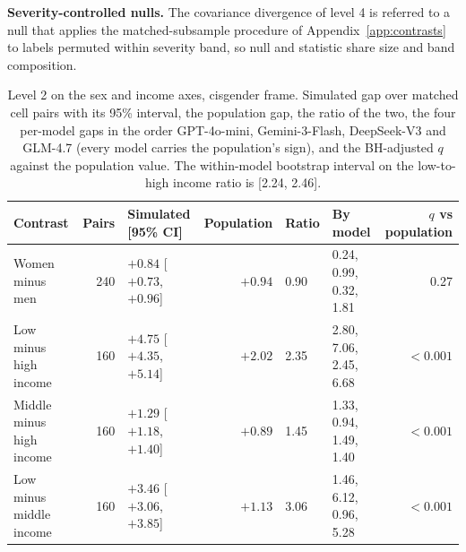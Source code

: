 \documentclass[wcp]{jmlr}
\begin{document}
\textbf{Severity-controlled nulls.} The covariance divergence of level 4 is referred to a null that applies the matched-subsample procedure of Appendix~\ref{app:contrasts} to labels permuted within severity band, so null and statistic share size and band composition.

\begin{table}[!htb]
\centering
\caption{Level 2 on the sex and income axes, cisgender frame. Simulated gap over matched cell pairs with its 95\% interval, the population gap, the ratio of the two, the four per-model gaps in the order GPT-4o-mini, Gemini-3-Flash, DeepSeek-V3 and GLM-4.7 (every model carries the population's sign), and the BH-adjusted $q$ against the population value. The within-model bootstrap interval on the low-to-high income ratio is [2.24, 2.46].}
\label{tab:level2ext}
\scriptsize
\setlength{\tabcolsep}{3pt}
\begin{tabular}{lrlrllr}
\toprule
Contrast & Pairs & Simulated [95\% CI] & Population & Ratio & By model & $q$ vs population \\
\midrule
Women minus men & 240 & $+0.84$ [$+0.73$, $+0.96$] & $+0.94$ & 0.90 & 0.24, 0.99, 0.32, 1.81 & 0.27 \\
Low minus high income & 160 & $+4.75$ [$+4.35$, $+5.14$] & $+2.02$ & 2.35 & 2.80, 7.06, 2.45, 6.68 & $<0.001$ \\
Middle minus high income & 160 & $+1.29$ [$+1.18$, $+1.40$] & $+0.89$ & 1.45 & 1.33, 0.94, 1.49, 1.40 & $<0.001$ \\
Low minus middle income & 160 & $+3.46$ [$+3.06$, $+3.85$] & $+1.13$ & 3.06 & 1.46, 6.12, 0.96, 5.28 & $<0.001$ \\
\bottomrule
\end{tabular}
\end{table}
\end{document}

